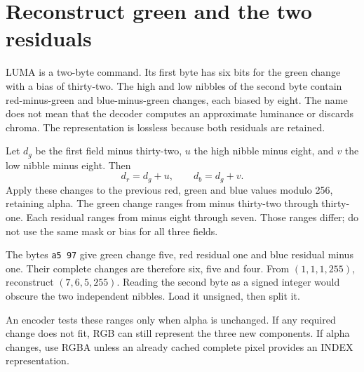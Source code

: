 \section{Reconstruct green and the two residuals}
LUMA is a two-byte command. Its first byte has six bits for the green change with a
bias of thirty-two. The high and low nibbles of the second byte contain red-minus-green
and blue-minus-green changes, each biased by eight. The name does not mean that the
decoder computes an approximate luminance or discards chroma. The representation is
lossless because both residuals are retained.

Let \(d_g\) be the first field minus thirty-two, \(u\) the high nibble minus eight,
and \(v\) the low nibble minus eight. Then
\[
d_r=d_g+u,\qquad d_b=d_g+v.
\]
Apply these changes to the previous red, green and blue values modulo 256, retaining
alpha. The green change ranges from minus thirty-two through thirty-one. Each residual
ranges from minus eight through seven. Those ranges differ; do not use the same mask
or bias for all three fields.

The bytes \texttt{a5 97} give green change five, red residual one and blue residual
minus one. Their complete changes are therefore six, five and four. From
\((1,1,1,255)\), reconstruct \((7,6,5,255)\). Reading the second byte as a signed
integer would obscure the two independent nibbles. Load it unsigned, then split it.

An encoder tests these ranges only when alpha is unchanged. If any required change
does not fit, RGB can still represent the three new components. If alpha changes,
use RGBA unless an already cached complete pixel provides an INDEX representation.

